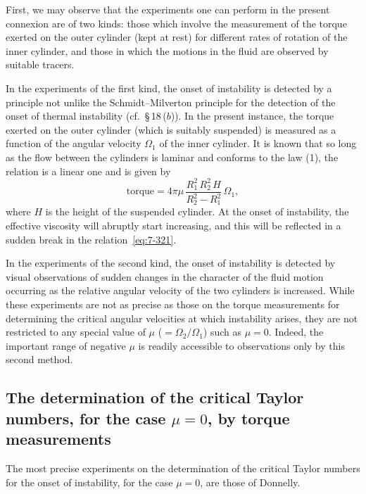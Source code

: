 First, we may observe that the experiments one can perform in the
present connexion are of two kinds: those which involve the measure\-ment
of the torque exerted on the outer cylinder (kept at rest) for different
rates of rotation of the inner cylinder, and those in which the motions in
the fluid are observed by suitable tracers.

In the experiments of the first kind, the onset of instability is detected
by a principle not unlike the Schmidt--Milverton principle for the
detection of the onset of thermal instability (cf.\ \S\,18\,($b$)).  In the present
instance, the torque exerted on the outer cylinder (which is suitably
suspended) is measured as a function of the angular velocity $\Omega_1$ of the
inner cylinder.  It is known that so long as the flow between the cylinders
is laminar and conforms to the law (1), the relation is a linear one and is
given by
\begin{equation}\label{eq:7-321}
\text{torque} = 4\pi\mu\,\frac{R_1^2\,R_2^2\,H}{R_2^2 - R_1^2}\,\Omega_1,
\end{equation}
where $H$ is the height of the suspended cylinder.  At the onset of instability,
the effective viscosity will abruptly start increasing, and this
will be reflected in a sudden break in the relation~\eqref{eq:7-321}.

In the experiments of the second kind, the onset of instability is
detected by visual observations of sudden changes in the character of the
fluid motion occurring as the relative angular velocity of the two
cylinders is increased.  While these experiments are not as precise as
those on the torque measurements for determining the critical angular
velocities at which instability arises, they are not restricted to any special
value of $\mu$ ($= \Omega_2/\Omega_1$) such as $\mu = 0$.  Indeed, the important range of
negative $\mu$ is readily accessible to observations only by this second
method.

\subsection{The determination of the critical Taylor numbers, for the case $\mu = 0$,
by torque measurements}\label{sec:7-74a}

The most precise experiments on the determination of the critical
Taylor numbers for the onset of instability, for the case $\mu = 0$, are those
of Donnelly.

